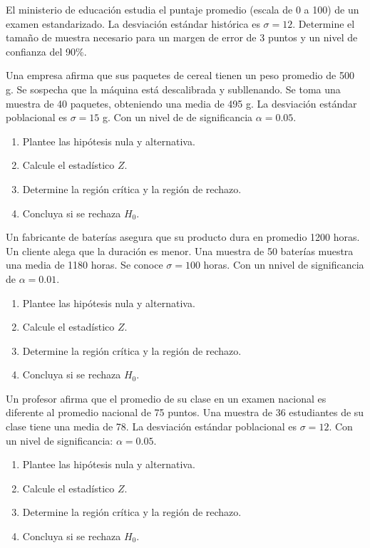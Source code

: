 \documentclass[addpoints,12pt]{exam}
\theoremstyle{plain}
\theoremstyle{remark}
\theoremstyle{definition}
\begin{document}
\begin{questions}
 \question El ministerio de educación estudia el puntaje promedio (escala de 0 a 100) de un examen estandarizado. La desviación estándar histórica es \(\sigma = 12\). Determine el tamaño de muestra necesario para un margen de error de 3 puntos y un nivel de confianza del 90\%.  


 \question Una empresa afirma que sus paquetes de cereal tienen un peso promedio de 500 g. Se sospecha que la máquina está descalibrada y subllenando. Se toma una muestra de 40 paquetes, obteniendo una media de 495 g. La desviación estándar poblacional es \( \sigma = 15 \) g. Con un nivel de de significancia \( \alpha = 0.05 \). 
\begin{enumerate}[$1.$]
\item Plantee las hipótesis nula y alternativa.  
\item Calcule el estadístico \( Z \).  
\item Determine la región crítica y la región de rechazo.  
\item Concluya si se rechaza \( H_0 \).  
\end{enumerate}

 \question Un fabricante de baterías asegura que su producto dura en promedio 1200 horas. Un cliente alega que la duración es menor. Una muestra de 50 baterías muestra una media de 1180 horas. Se conoce \( \sigma = 100 \) horas.  Con un nnivel de significancia de \( \alpha = 0.01 \).  

\begin{enumerate}[$1.$]
\item Plantee las hipótesis nula y alternativa.  
\item Calcule el estadístico \( Z \).  
\item Determine la región crítica y la región de rechazo.  
\item Concluya si se rechaza \( H_0 \).  
\end{enumerate}

 \question Un profesor afirma que el promedio de su clase en un examen nacional es diferente al promedio nacional de 75 puntos. Una muestra de 36 estudiantes de su clase tiene una media de 78. La desviación estándar poblacional es \( \sigma = 12 \).  Con un nivel de significancia: \( \alpha = 0.05 \).  

\begin{enumerate}[$1.$]
\item Plantee las hipótesis nula y alternativa.  
\item Calcule el estadístico \( Z \).  
\item Determine la región crítica y la región de rechazo.  
\item Concluya si se rechaza \( H_0 \).  
\end{enumerate}


\end{questions}
\end{document}
